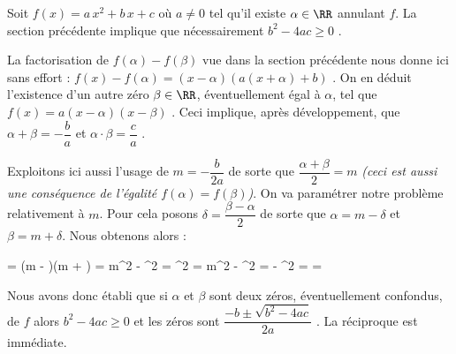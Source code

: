 Soit $f(x) = a \, x^2 + b \, x + c$ où $a \neq 0$ tel qu'il existe $\alpha \in \RR$ annulant $f$.
La section précédente implique que nécessairement $b^2 - 4 ac \geq 0$ .

\medskip

La factorisation de $f(\alpha) - f(\beta)$ vue dans la section précédente nous donne ici sans effort : 
$f(x) - f(\alpha) = (x - \alpha) (a (x + \alpha) + b)$ .
On en déduit l'existence d'un autre zéro $\beta \in \RR$, éventuellement égal à $\alpha$, tel que
$f(x) = a (x - \alpha) (x - \beta)$ .
Ceci implique, après développement, que
$\alpha   +   \beta = - \dfrac{b}{a}$
et
$\alpha \cdot \beta = \dfrac{c}{a}$ .


\medskip

Exploitons ici aussi l'usage de $m = - \dfrac{b}{2a}$ de sorte que
$\dfrac{\alpha + \beta}{2} = m$
\emph{(ceci est aussi une conséquence de l'égalité $f(\alpha) = f(\beta)$)}.
On va paramétrer notre problème relativement à $m$.
Pour cela posons
$\delta = \dfrac{\beta - \alpha}{2}$ de sorte que
$\alpha = m - \delta$ et $\beta = m + \delta$.
Nous obtenons alors :

\medskip

\begin{explain}[style = sar, ope = \iff]
	\alpha \cdot \beta = 
		\explnext{}
	(m - \delta)(m + \delta) = 
		\explnext{}
	m^2 - \delta^2 = 
		\explnext{}
	\delta^2 = m^2 - 
		\explnext{}
	\delta^2 =  - 
		\explnext{}
	\delta^2 = 
	\delta = \pm {}
\end{explain}

\medskip

Nous avons donc établi que si $\alpha$ et $\beta$ sont deux zéros, éventuellement confondus, de $f$ alors $b^2 - 4 ac \geq 0$ et les zéros sont $\dfrac{-b \pm \sqrt{b^2 - 4 ac}}{2 a}$ .
La réciproque est immédiate.
